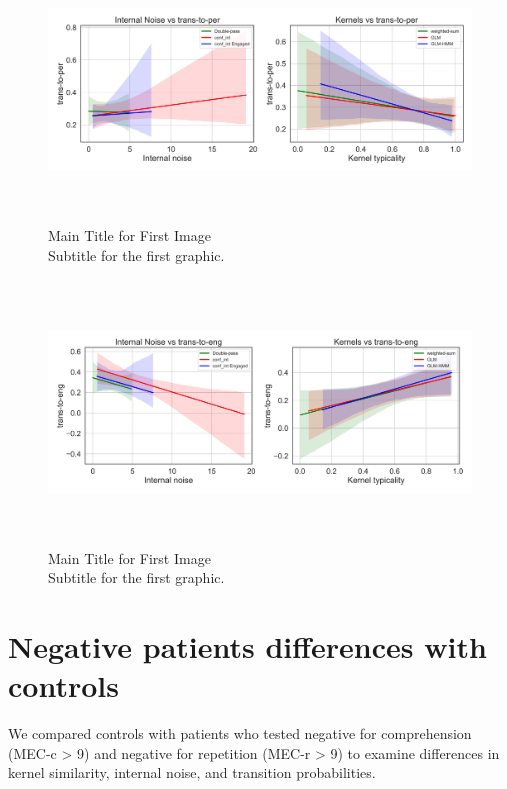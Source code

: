 \begin{figure}[H]
    \centering
    \includegraphics[width=17cm,height=7cm]{MainLayout/Images/chapter8/regression_results_per.jpg}
    \caption{Main Title for First Image \\ \small Subtitle for the first graphic.}
    \label{fig:regression_results_per_per}
\end{figure}
\begin{figure}[H]
    \centering
    \includegraphics[width=17cm,height=7cm]{MainLayout/Images/chapter8/regression_results_unper.jpg}
    \caption{Main Title for First Image \\ \small Subtitle for the first graphic.}
    \label{fig:regression_results_eng_eng}
\end{figure}
\section{Negative patients differences with controls} 

We compared controls with patients who tested negative for comprehension (MEC-c > 9) and negative for repetition (MEC-r > 9) to examine differences in kernel similarity, internal noise, and transition probabilities.

